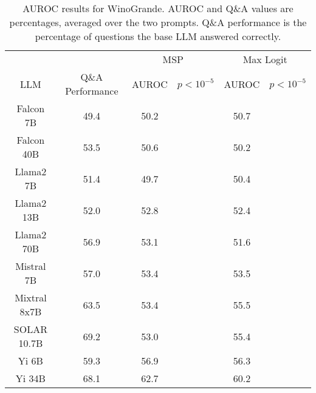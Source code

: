 \begin{table*}
\centering
\begin{tabular}{c|c|c|c|c|c}
& & \multicolumn{2}{c|}{MSP} & \multicolumn{2}{c}{Max Logit} \\ 
LLM & Q\&A Performance & AUROC & $p < 10^{-5}$ & AUROC & $p < 10^{-5}$\\ \hline
Falcon 7B & 49.4 & 50.2 &  & 50.7 & \\
Falcon 40B & 53.5 & 50.6 &  & 50.2 & \\
Llama2 7B & 51.4 & 49.7 &  & 50.4 & \\
Llama2 13B & 52.0 & 52.8 &  & 52.4 & \\
Llama2 70B & 56.9 & 53.1 &  & 51.6 & \\
Mistral 7B & 57.0 & 53.4 &  & 53.5 & \\
Mixtral 8x7B & 63.5 & 53.4 &  & 55.5 & \\
SOLAR 10.7B & 69.2 & 53.0 &  & 55.4 & \\
Yi 6B & 59.3 & 56.9 &  & 56.3 & \\
Yi 34B & 68.1 & 62.7 &  & 60.2 & \\
\hline
\end{tabular}
\caption{AUROC results for WinoGrande. AUROC and Q\&A values are percentages, averaged over the two prompts. Q\&A performance is the percentage of questions the base LLM answered correctly.}
\label{tab:winogrande_auroc}
\end{table*}
